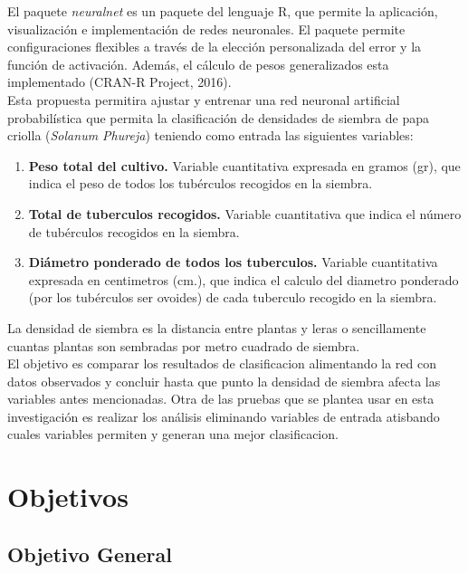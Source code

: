 El paquete \textit{neuralnet} es un paquete del lenguaje R,  que permite la aplicación, visualización e implementación de redes neuronales. El paquete permite configuraciones flexibles a través de la elección personalizada del error y la función de activación. Además, el cálculo de pesos generalizados esta implementado (CRAN-R Project, 2016).\\

Esta propuesta permitira ajustar y entrenar una red neuronal artificial probabil\'istica que permita la clasificación de densidades de siembra de papa criolla (\textit{Solanum Phureja}) teniendo como entrada las siguientes variables: 

\begin{enumerate}
    \item{\textbf{Peso total del cultivo.} Variable cuantitativa expresada en gramos (gr), que indica el peso de todos los tubérculos recogidos en la siembra.}
	\item{\textbf{Total de tuberculos recogidos.} Variable cuantitativa que indica el número de tubérculos recogidos en la siembra.}
	\item{\textbf{Diámetro ponderado de todos los tuberculos.} Variable cuantitativa expresada en centimetros (cm.), que indica el calculo del diametro ponderado (por los tubérculos ser ovoides) de cada tuberculo recogido en la siembra.}
\end{enumerate}

La densidad de siembra es la distancia entre plantas y leras o sencillamente cuantas plantas son sembradas por metro cuadrado de siembra.\\

El objetivo es comparar los resultados de clasificacion alimentando la red con datos observados y concluir hasta que punto la densidad de siembra afecta las variables antes mencionadas. Otra de las pruebas que se plantea usar en esta investigación es realizar los análisis eliminando variables de entrada atisbando cuales variables permiten y generan una mejor clasificacion.\\

\section{Objetivos}

\subsection{Objetivo General}

